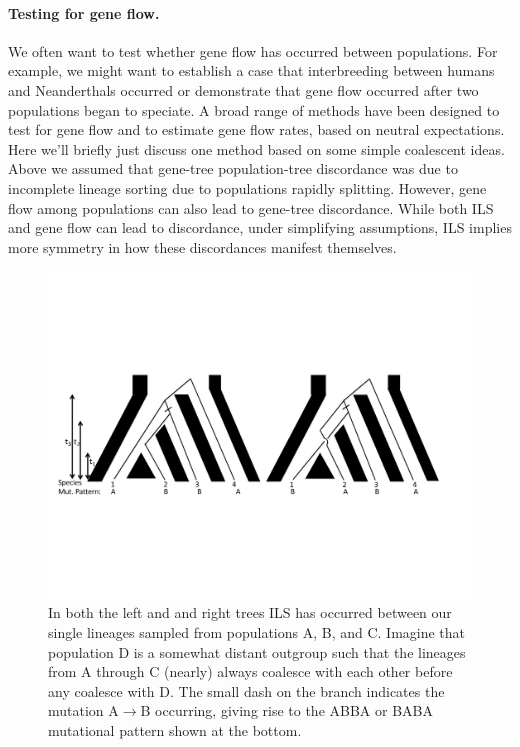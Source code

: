 \paragraph{Testing for gene flow.} 

We often want to test whether gene flow has occurred between populations. For example, we might want to establish a case
that interbreeding between humans and Neanderthals occurred or demonstrate that
gene flow occurred after two populations began to speciate. 
A broad range of methods have been designed to test for gene flow and
to estimate gene flow rates, based on neutral expectations. Here we'll briefly just discuss one method based on
some simple coalescent ideas.  Above we assumed that gene-tree population-tree discordance was due to
incomplete lineage sorting due to populations rapidly
splitting. However, gene flow among populations can also lead to gene-tree discordance.
While both ILS and gene flow can lead to discordance, under
simplifying assumptions, ILS implies more symmetry in how these
discordances manifest themselves.\\


\begin{figure}
\begin{center}
\includegraphics[width=\textwidth]{figures/Genetic_drift/ILS/ABBA_BABA_coal.pdf}
\end{center}
\caption{ In both the left and and right trees ILS has occurred between our single lineages sampled from populations A, B, and C. Imagine that population D is a somewhat distant outgroup
such that the lineages from A through C (nearly) always coalesce with each other before any coalesce with D. The small dash on the branch indicates the mutation A$\rightarrow$B occurring, giving rise to the
ABBA or BABA mutational pattern shown at the bottom. } \label{fig:ABBA_BABA} 
\end{figure}

